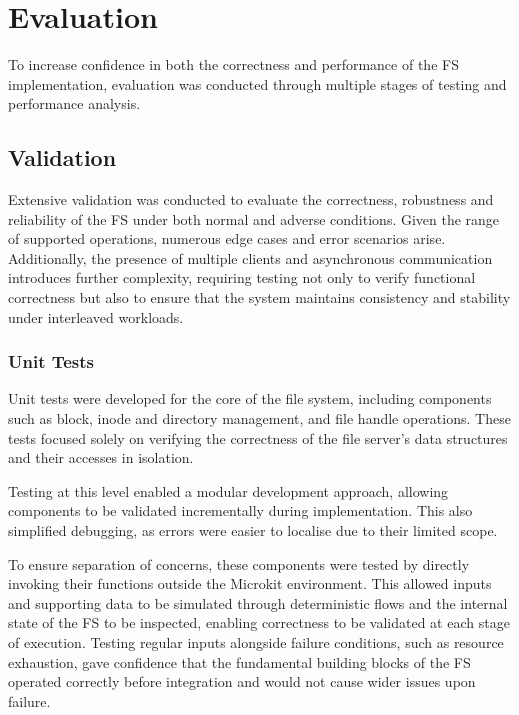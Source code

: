 \chapter{Evaluation}
\label{cha:evaluation}

To increase confidence in both the correctness and performance of the FS implementation, evaluation was conducted through multiple stages of testing and performance analysis. 

\section{Validation}

Extensive validation was conducted to evaluate the correctness, robustness and reliability of the FS under both normal and adverse conditions. Given the range of supported operations, numerous edge cases and error scenarios arise. Additionally, the presence of multiple clients and asynchronous communication introduces further complexity, requiring testing not only to verify functional correctness but also to ensure that the system maintains consistency and stability under interleaved workloads.

\subsection{Unit Tests}

Unit tests were developed for the core of the file system, including components such as block, inode and directory management, and file handle operations. These tests focused solely on verifying the correctness of the file server’s data structures and their accesses in isolation.

Testing at this level enabled a modular development approach, allowing components to be validated incrementally during implementation. This also simplified debugging, as errors were easier to localise due to their limited scope.

To ensure separation of concerns, these components were tested by directly invoking their functions outside the Microkit environment. This allowed inputs and supporting data to be simulated through deterministic flows and the internal state of the FS to be inspected, enabling correctness to be validated at each stage of execution. Testing regular inputs alongside failure conditions, such as resource exhaustion, gave confidence that the fundamental building blocks of the FS operated correctly before integration and would not cause wider issues upon failure.

